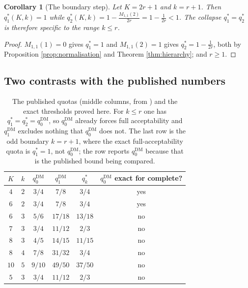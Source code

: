 \documentclass[11pt]{article}
\theoremstyle{plain}
\newtheorem{corollary}{Corollary}
\theoremstyle{definition}
\newcommand{\DM}{\mathrm{DM}}
\begin{document}
\begin{corollary}[The boundary step]
\label{cor:boundarystep}
Let $K=2r+1$ and $k=r+1$. Then $q_1^*(K,k)=1$ while $q_2^*(K,k)=1-\frac{M_{1,1}(2)}{2r}=1-\frac{1}{2r}<1$. The collapse $q_1^*=q_2^*$ is therefore specific to the range $k\le r$.
\end{corollary}

\begin{proof}
$M_{1,1}(1)=0$ gives $q_1^*=1$ and $M_{1,1}(2)=1$ gives $q_2^*=1-\frac{1}{2r}$, both by Proposition \ref{prop:normalisation} and Theorem \ref{thm:hierarchy}; and $r\ge1$.
\end{proof}

\subsection{Two contrasts with the published numbers}

\begin{table}[htbp]
\centering
\small
\begin{tabular}{cccccc}
\toprule
$K$ & $k$ & $q_0^{\DM}$ & $q_1^{\DM}$ & $q_k^*$ & $q_0^{\DM}$ exact for complete?\\
\midrule
$4$ & $2$ & $3/4$ & $7/8$ & $3/4$ & yes\\
$6$ & $2$ & $3/4$ & $7/8$ & $3/4$ & yes\\
$6$ & $3$ & $5/6$ & $17/18$ & $13/18$ & no\\
$7$ & $3$ & $3/4$ & $11/12$ & $2/3$ & no\\
$8$ & $3$ & $4/5$ & $14/15$ & $11/15$ & no\\
$8$ & $4$ & $7/8$ & $31/32$ & $3/4$ & no\\
$10$ & $5$ & $9/10$ & $49/50$ & $37/50$ & no\\
\midrule
$5$ & $3$ & $3/4$ & $11/12$ & $2/3$ & no\\
\bottomrule
\end{tabular}
\caption{The published quotas (middle columns, from \cite[Proposition~2 and Table~1]{DissMahajne2020}) and the exact thresholds proved here. For $k\le r$ one has $q_1^*=q_2^*=q_0^{\DM}$, so $q_0^{\DM}$ already forces full acceptability and $q_1^{\DM}$ excludes nothing that $q_0^{\DM}$ does not. The last row is the odd boundary $k=r+1$, where the exact full-acceptability quota is $q_1^*=1$, not $q_0^{\DM}$; the row reports $q_0^{\DM}$ because that is the published bound being compared.}
\label{tab:contrast}
\end{table}
\end{document}
